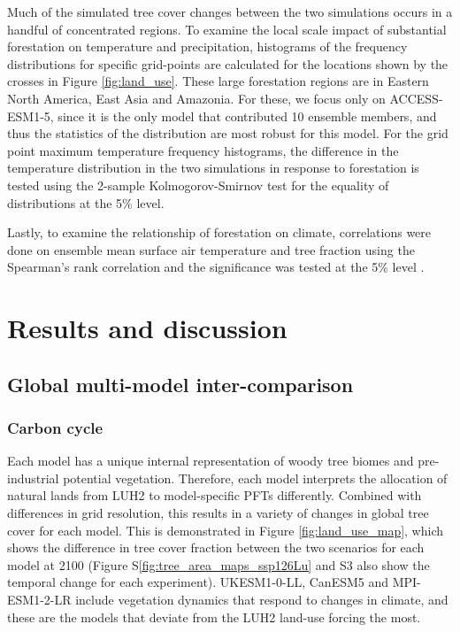 \documentclass[]{article}
\begin{document}
Much of the simulated tree cover changes between the two simulations occurs in a handful of concentrated regions.
To examine the local scale impact of substantial forestation on temperature and precipitation, histograms of the frequency distributions for specific grid-points are calculated for the locations shown by the crosses in Figure \ref{fig:land_use}.
These large forestation regions are in Eastern North America, East Asia and Amazonia.
For these, we focus only on ACCESS-ESM1-5, since it is the only model that contributed 10 ensemble members, and thus the statistics of the distribution are most robust for this model.
For the grid point maximum temperature frequency histograms, the difference in the temperature distribution in the two simulations in response to forestation is tested using the 2-sample Kolmogorov-Smirnov test for the equality of distributions at the 5\% level.

Lastly, to examine the relationship of forestation on climate, correlations were done on ensemble mean surface air temperature and tree fraction using the Spearman's rank correlation and the significance was tested at the 5\% level \parencite{kokoska2000crc}.

\section{Results and discussion}

\subsection{Global multi-model inter-comparison}

\subsubsection{Carbon cycle}

Each model has a unique internal representation of woody tree biomes and pre-industrial potential vegetation.
Therefore, each model interprets the allocation of natural lands from LUH2 to model-specific PFTs differently.
Combined with differences in grid resolution, this results in a variety of changes in global tree cover for each model.
This is demonstrated in Figure \ref{fig:land_use_map}, which shows the difference in tree cover fraction between the two scenarios for each model at 2100 (Figure S\ref{fig:tree_area_maps_ssp126Lu} and S3 also show the temporal change for each experiment).
UKESM1-0-LL, CanESM5 and MPI-ESM1-2-LR include vegetation dynamics that respond to changes in climate, and these are the models that deviate from the LUH2 land-use forcing the most.
\end{document}
